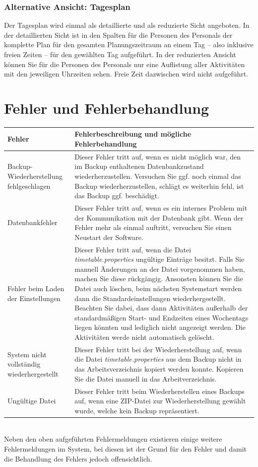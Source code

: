 \documentclass[fontsize=12pt]{scrartcl}
\begin{document}
\subsubsection{Alternative Ansicht: Tagesplan}
Der Tagesplan wird einmal als detaillierte und als reduzierte Sicht angeboten. In der detaillierten Sicht ist in den Spalten für die Personen des Personals der komplette Plan für den gesamten Planungszeitraum an einem Tag -- also inklusive freien Zeiten -- für den gewählten Tag aufgeführt. In der reduzierten Ansicht können Sie für die Personen des Personals nur eine Auflistung aller Aktivitäten mit den jeweiligen Uhrzeiten sehen. Freie Zeit dazwischen wird nicht aufgeführt.


\section{Fehler und Fehlerbehandlung}
\renewcommand{\arraystretch}{1.5}
\begin{tabularx}{\textwidth}{|p{5cm}|X|}
\hline
\textbf{Fehler} & \textbf{Fehlerbeschreibung und mögliche Fehlerbehandlung}\\\hline
Backup-Wiederherstellung fehlgeschlagen & Dieser Fehler tritt auf, wenn es nicht möglich war, den im Backup enthaltenen Datenbankzustand wiederherzustellen. Versuchen Sie ggf. noch einmal das Backup wiederherzustellen, schlägt es weiterhin fehl, ist das Backup ggf. beschädigt.\\\hline
Datenbankfehler & Dieser Fehler tritt auf, wenn es ein internes Problem mit der Kommunikation mit der Datenbank gibt. Wenn der Fehler mehr als einmal auftritt, versuchen Sie einen Neustart der Software.\\\hline
Fehler beim Laden der Einstellungen & Dieser Fehler tritt auf, wenn die Datei \textit{timetable.properties} ungültige Einträge besitzt. Falls Sie manuell Änderungen an der Datei vorgenommen haben, machen Sie diese rückgängig. Ansonsten können Sie die Datei auch löschen, beim nächsten Systemstart werden dann die Standardeinstellungen wiederhergestellt. Beachten Sie dabei, dass dann Aktivitäten außerhalb der standardmäßigen Start- und Endzeiten eines Wochentags liegen könnten und lediglich nicht angezeigt werden. Die Aktivitäten werde nicht automatisch gelöscht.\\\hline
System nicht vollständig wiederhergestellt & Dieser Fehler tritt bei der Wiederherstellung auf, wenn die Datei \textit{timetable.properties} aus dem Backup nicht in das Arbeitsverzeichnis kopiert werden konnte. Kopieren Sie die Datei manuell in das Arbeitverzeichnis.\\\hline
Ungültige Datei & Dieser Fehler tritt beim Wiederherstellen eines Backups auf, wenn eine ZIP-Datei zur Wiederherstellung gewählt wurde, welche kein Backup repräsentiert.\\\hline
\end{tabularx}\\

Neben den oben aufgeführten Fehlermeldungen existieren einige weitere Fehlermeldungen im System, bei diesen ist der Grund für den Fehler und damit die Behandlung des Fehlers jedoch offensichtlich.
\end{document}
